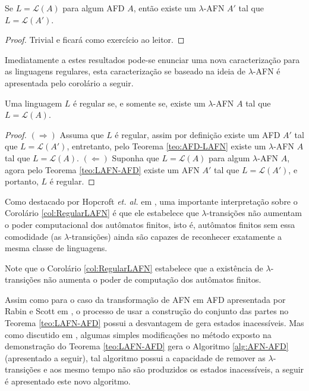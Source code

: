 \begin{theorem}\label{teo:AFD-LAFN}
	Se $L = \mathcal{L}(A)$ para algum AFD $A$, então existe um $\lambda$-AFN $A'$ tal que $L = \mathcal{L}(A')$.
\end{theorem}

\begin{proof}
	Trivial e ficará como exercício ao leitor.
\end{proof}

Imediatamente a estes resultados pode-se enunciar uma nova caracterização para as linguagens regulares, esta caracterização se baseado na ideia de $\lambda$-AFN é apresentada pelo corolário a seguir.

\begin{corollary}\label{col:RegularLAFN}
	Uma linguagem $L$ é regular se, e somente se, existe um $\lambda$-AFN $A$ tal que $L = \mathcal{L}(A)$.
\end{corollary}

\begin{proof}
	$(\Rightarrow)$ Assuma que $L$ é regular, assim por definição existe um AFD $A'$ tal que $L = \mathcal{L}(A')$, entretanto, pelo Teorema \ref{teo:AFD-LAFN} existe um $\lambda$-AFN $A$ tal que $L = \mathcal{L}(A)$. $(\Leftarrow)$ Suponha que $L = \mathcal{L}(A)$ para algum $\lambda$-AFN $A$, agora pelo Teorema \ref{teo:LAFN-AFD} existe um AFN $A'$ tal que $L = \mathcal{L}(A')$, e portanto, $L$ é regular.
\end{proof}

Como destacado por Hopcroft \textit{et. al.} em \cite{hopcroft2008},  uma importante interpretação sobre o Corolário  \ref{col:RegularLAFN}  é que ele estabelece que $\lambda$-transições não aumentam o poder computacional dos autômatos finitos, isto é, autômatos finitos sem essa comodidade (as $\lambda$-transições) ainda são capazes de reconhecer exatamente a mesma classe de linguagens.

\begin{remark}
	Note que o Corolário \ref{col:RegularLAFN} estabelece que a existência de $\lambda$-transições não aumenta o poder de computação dos autômatos finitos.
\end{remark}

Assim como para o caso da transformação de AFN em AFD apresentada por Rabin e Scott em \cite{rabin1959}, o processo de usar a construção do conjunto das partes no Teorema \ref{teo:LAFN-AFD} possui a desvantagem de gera estados inacessíveis. Mas como discutido em \cite{benja-2011, benja-2015, hopcroft2008, linz2006}, algumas simples modificações no método exposto na demonstração do Teorema \ref{teo:LAFN-AFD} gera o Algoritmo \ref{alg:AFN-AFD} (apresentado a seguir), tal  algoritmo possui a capacidade de remover as $\lambda$-transições e aos mesmo tempo não são produzidos os estados inacessíveis, a seguir é apresentado este novo algoritmo.


